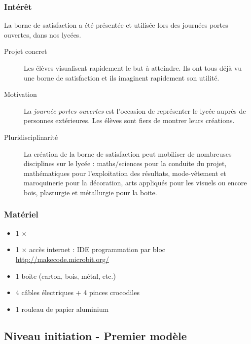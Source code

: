 \subsubsection{Intérêt}

La borne de satisfaction a été présentée et utilisée lors des journées portes ouvertes, dans nos lycées.

\begin{description}
    \item [Projet concret] Les élèves visualisent rapidement le but à atteindre. Ils ont tous déjà vu une borne de satisfaction et ils imaginent rapidement son utilité. 
    \item [Motivation] La \textit{journée portes ouvertes} est l'occasion de représenter le lycée auprès de personnes extérieures. Les élèves sont fiers de montrer leurs créations.
    \item [Pluridisciplinarité] La création de la borne de satisfaction peut mobiliser de nombreuses disciplines sur le lycée : maths/sciences pour la conduite du projet, mathématiques pour l'exploitation des résultats, mode-vêtement et maroquinerie pour la décoration, arts appliqués pour les visuels ou encore bois, plasturgie et métallurgie pour la boite.
\end{description}


\subsubsection{Matériel}
\begin{itemize}
    \item 1 $\times$ \matosMb
    \item 1 $\times$ accès internet : IDE programmation par bloc \url{http://makecode.microbit.org/}\\[1em]
    \item 1 boite (carton, bois, métal, etc.)
    \item 4 câbles électriques + 4 pinces crocodiles
    \item 1 rouleau de papier aluminium
\end{itemize}


%
%

\newpage

\subsection{Niveau initiation - Premier modèle}

